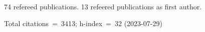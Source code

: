 74 refereed publications. 13 refeered publications as first author.

Total citations~=~3413; h-index~=~32 (2023-07-29)